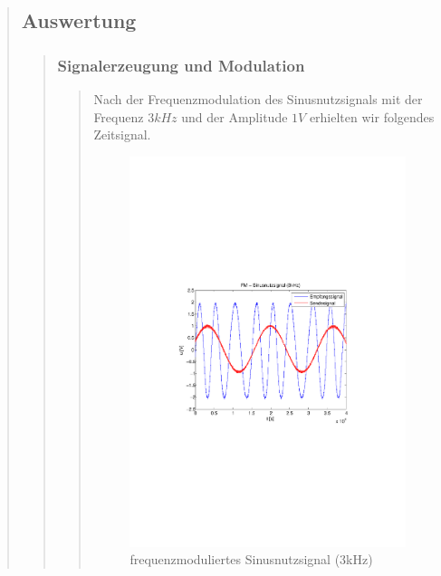 \begin{quote}
    \subsection{Auswertung}
    \begin{quote}
    	
    	\subsubsection{Signalerzeugung und Modulation}
    	\begin{quote}
    	
        Nach der Frequenzmodulation des Sinusnutzsignals mit der Frequenz 
        $3 kHz$ und der Amplitude $1 V$ erhielten wir folgendes Zeitsignal.
    	
             \begin{figure}[H] \centering
                   
                    \includegraphics[scale=0.5, trim = 3cm 8.5cm 3.5cm 8.5cm,
                    clip]{./Bilder/fm_sinus(3kHz)}
                        \caption{frequenzmoduliertes Sinusnutzsignal (3kHz)}
                \end{figure}
        

\end{quote}
\end{quote}
\end{quote}
